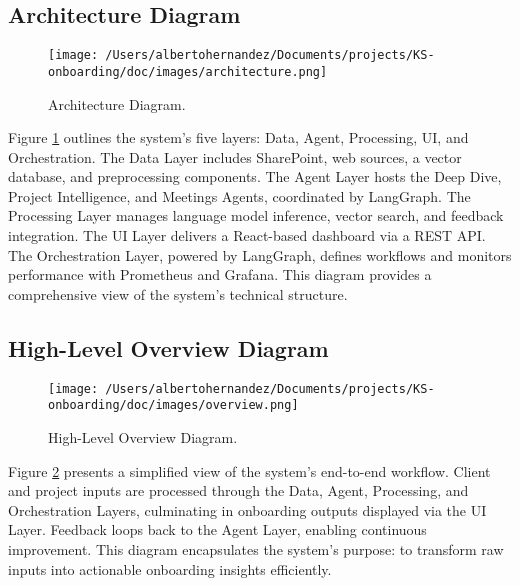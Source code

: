 \documentclass{article}
\begin{document}
\subsection{Architecture Diagram}
\begin{figure}[h]
    \centering
    \texttt{[image: /Users/albertohernandez/Documents/projects/KS-onboarding/doc/images/architecture.png]}
    \caption{Architecture Diagram.}
    \label{fig:architecture}
\end{figure}
Figure \ref{fig:architecture} outlines the system’s five layers: Data, Agent, Processing, UI, and Orchestration. The Data Layer includes SharePoint, web sources, a vector database, and preprocessing components. The Agent Layer hosts the Deep Dive, Project Intelligence, and Meetings Agents, coordinated by LangGraph. The Processing Layer manages language model inference, vector search, and feedback integration. The UI Layer delivers a React-based dashboard via a REST API. The Orchestration Layer, powered by LangGraph, defines workflows and monitors performance with Prometheus and Grafana. This diagram provides a comprehensive view of the system’s technical structure.

\subsection{High-Level Overview Diagram}
\begin{figure}[h]
    \centering
    \texttt{[image: /Users/albertohernandez/Documents/projects/KS-onboarding/doc/images/overview.png]}
    \caption{High-Level Overview Diagram.}
    \label{fig:overview}
\end{figure}
Figure \ref{fig:overview} presents a simplified view of the system’s end-to-end workflow. Client and project inputs are processed through the Data, Agent, Processing, and Orchestration Layers, culminating in onboarding outputs displayed via the UI Layer. Feedback loops back to the Agent Layer, enabling continuous improvement. This diagram encapsulates the system’s purpose: to transform raw inputs into actionable onboarding insights efficiently.
\end{document}
